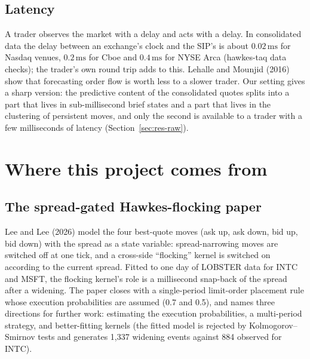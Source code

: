 \documentclass[11pt]{article}
\theoremstyle{definition}
\theoremstyle{remark}
\newcommand{\ms}{\,\text{ms}}
\begin{document}
\subsection{Latency}
\label{sec:bg-latency}

A trader observes the market with a delay and acts with a delay. In consolidated data the delay between an exchange's clock and the SIP's is about $0.02\ms$ for Nasdaq venues, $0.2\ms$ for Cboe and $0.4\ms$ for NYSE Arca (hawkes-taq data checks); the trader's own round trip adds to this. Lehalle and Mounjid (2016) show that forecasting order flow is worth less to a slower trader. Our setting gives a sharp version: the predictive content of the consolidated quotes splits into a part that lives in sub-millisecond brief states and a part that lives in the clustering of persistent moves, and only the second is available to a trader with a few milliseconds of latency (Section~\ref{sec:res-raw}).

\section{Where this project comes from}
\label{sec:origins}

\subsection{The spread-gated Hawkes-flocking paper}

Lee and Lee (2026) model the four best-quote moves (ask up, ask down, bid up, bid down) with the spread as a state variable: spread-narrowing moves are switched off at one tick, and a cross-side ``flocking'' kernel is switched on according to the current spread. Fitted to one day of LOBSTER data for INTC and MSFT, the flocking kernel's role is a millisecond snap-back of the spread after a widening. The paper closes with a single-period limit-order placement rule whose execution probabilities are assumed (0.7 and 0.5), and names three directions for further work: estimating the execution probabilities, a multi-period strategy, and better-fitting kernels (the fitted model is rejected by Kolmogorov--Smirnov tests and generates 1,337 widening events against 884 observed for INTC).
\end{document}
